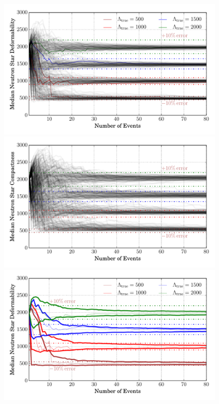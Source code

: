 \documentclass[aps,prd,amsmath,floats,floatfix, twocolumn,
superscriptaddress,nofootinbib,showpacs]{revtex4-1}
\begin{document}
\begin{figure}
\centering
\includegraphics[trim=20 0 0 0, width=1.02\columnwidth]{plots/LambdaMedian_vs_N_AllPopulation}
\includegraphics[trim=20 0 0 0, width=1.02\columnwidth]{plots/LambdaMedian_vs_N_AstroPopulation}\\
\includegraphics[trim=20 0 0 0, width=1.02\columnwidth]{plots/LambdaMedian90pc_vs_N_AllPopulation}

\end{figure}
\end{document}

